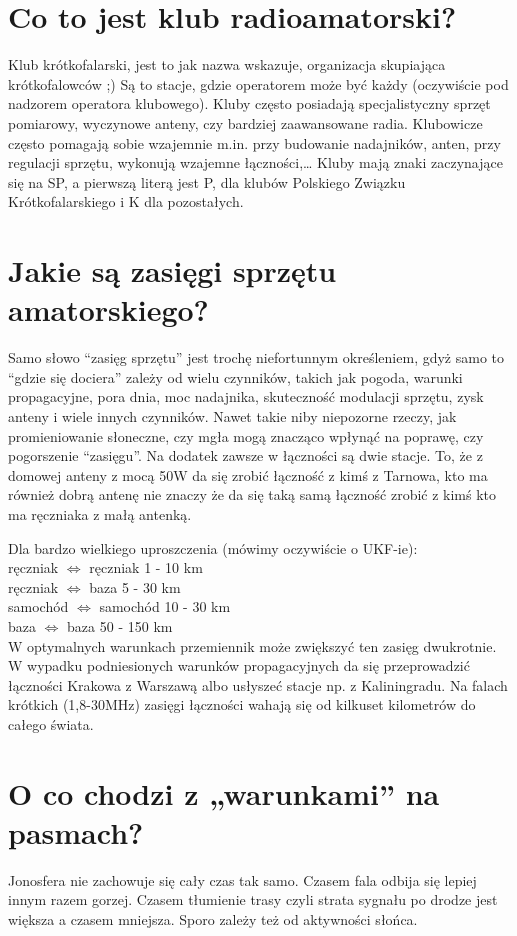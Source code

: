 \documentclass[a4paper,12pt]{article}
\begin{document}
\section{Co to jest klub radioamatorski?}
Klub krótkofalarski, jest to jak nazwa wskazuje, organizacja skupiająca krótkofalowców ;) Są to stacje, gdzie operatorem może być każdy (oczywiście pod nadzorem operatora klubowego). Kluby często posiadają specjalistyczny sprzęt pomiarowy, wyczynowe anteny, czy bardziej zaawansowane radia. Klubowicze często pomagają sobie wzajemnie m.in. przy budowanie nadajników, anten, przy regulacji sprzętu, wykonują wzajemne łączności,…
Kluby mają znaki zaczynające się na SP, a pierwszą literą jest P, dla klubów Polskiego Związku Krótkofalarskiego i K dla pozostałych.

\section{Jakie są zasięgi sprzętu amatorskiego?}
Samo słowo “zasięg sprzętu” jest trochę niefortunnym określeniem, gdyż samo to “gdzie się dociera” zależy od wielu czynników, takich jak pogoda, warunki propagacyjne, pora dnia, moc nadajnika, skuteczność modulacji sprzętu, zysk anteny i wiele innych czynników. Nawet takie niby niepozorne rzeczy, jak promieniowanie słoneczne, czy mgła mogą znacząco wpłynąć na poprawę, czy pogorszenie “zasięgu”.
Na dodatek zawsze w łączności są dwie stacje. To, że z domowej anteny z mocą 50W da się zrobić łączność z kimś z Tarnowa, kto ma również dobrą antenę nie znaczy że da się taką samą łączność zrobić z kimś kto ma ręczniaka z małą antenką. 

Dla bardzo wielkiego uproszczenia (mówimy oczywiście o UKF-ie):\\
ręczniak $\Leftrightarrow$ ręczniak 1 - 10 km\\
ręczniak $\Leftrightarrow$ baza 5 - 30 km\\
samochód $\Leftrightarrow$ samochód 10 - 30 km\\
baza $\Leftrightarrow$ baza 50 - 150 km \\

W optymalnych warunkach przemiennik może zwiększyć ten zasięg dwukrotnie.
W wypadku podniesionych warunków propagacyjnych da się przeprowadzić łączności Krakowa z Warszawą albo usłyszeć stacje np. z Kaliningradu.
Na falach krótkich (1,8-30MHz) zasięgi łączności wahają się od kilkuset kilometrów do całego świata. 

\section{O co chodzi z „warunkami” na pasmach?}
Jonosfera nie zachowuje się cały czas tak samo. Czasem fala odbija się lepiej innym razem gorzej. Czasem tłumienie trasy czyli strata sygnału po drodze jest większa a czasem mniejsza. 
Sporo zależy też od aktywności słońca.
\end{document}
